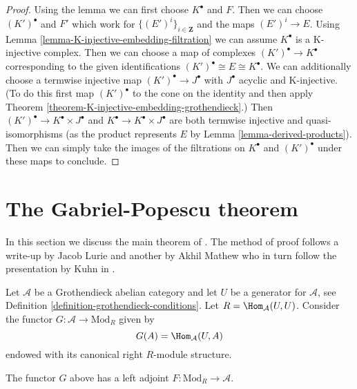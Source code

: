 \begin{proof}
Using the lemma we can first choose $K^\bullet$ and $F$.
Then we can choose $(K')^\bullet$ and $F'$ which work for
$\{(E')^i\}_{i \in \mathbf{Z}}$ and the maps $(E')^i \to E$.
Using Lemma \ref{lemma-K-injective-embedding-filtration}
we can assume $K^\bullet$ is a K-injective complex.
Then we can choose a map of complexes
$(K')^\bullet \to K^\bullet$ corresponding to
the given identifications
$(K')^\bullet \cong E \cong K^\bullet$.
We can additionally choose a termwise injective
map $(K')^\bullet \to J^\bullet$ with
$J^\bullet$ acyclic and K-injective.
(To do this first map $(K')^\bullet$ to the cone on the identity
and then apply Theorem \ref{theorem-K-injective-embedding-grothendieck}.)
Then $(K')^\bullet \to K^\bullet \times J^\bullet$ and
$K^\bullet \to K^\bullet \times J^\bullet$
are both termwise injective and quasi-isomorphisms
(as the product represents $E$ by Lemma \ref{lemma-derived-products}).
Then we can simply take the images of the filtrations
on $K^\bullet$ and $(K')^\bullet$ under these maps to conclude.
\end{proof}





\section{The Gabriel-Popescu theorem}
\label{section-gabriel-popescu}

\noindent
In this section we discuss the main theorem of \cite{GP}. The method of
proof follows a write-up by Jacob Lurie and another by Akhil Mathew
who in turn follow the presentation by Kuhn in \cite{Kuhn}.

\medskip\noindent
Let $\mathcal{A}$ be a Grothendieck abelian category and let $U$ be a
generator for $\mathcal{A}$, see
Definition \ref{definition-grothendieck-conditions}.
Let $R = \Hom_\mathcal{A}(U, U)$. Consider the functor
$G : \mathcal{A} \to \text{Mod}_R$ given by
$$
G(A) = \Hom_\mathcal{A}(U, A)
$$
endowed with its canonical right $R$-module structure.

\begin{lemma}
\label{lemma-gabriel-popescu-left-adjoint}
The functor $G$ above has a left adjoint
$F : \text{Mod}_R \to \mathcal{A}$.
\end{lemma}

